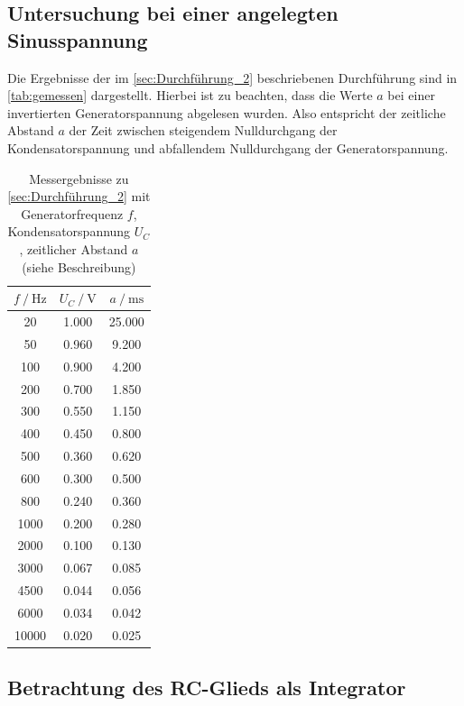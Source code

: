 \subsection{Untersuchung bei einer angelegten Sinusspannung}
\label{sec:Auswertung_Sinusspannung}

Die Ergebnisse der im \autoref{sec:Durchführung_2} beschriebenen Durchführung sind in \autoref{tab:gemessen} dargestellt. Hierbei ist zu beachten, dass die Werte $a$ bei einer invertierten Generatorspannung abgelesen wurden. Also entspricht der zeitliche Abstand $a$ der Zeit zwischen steigendem Nulldurchgang der Kondensatorspannung und abfallendem Nulldurchgang der Generatorspannung.

\begin{table}
    \centering
    \caption{Messergebnisse zu \autoref{sec:Durchführung_2} mit Generatorfrequenz $f$, Kondensatorspannung $U_C$, zeitlicher Abstand $a$ (siehe Beschreibung)}
    \label{tab:gemessen}
    \begin{tabular}{c c c}
        \toprule
        $f \:/\: \si{\hertz}$ & $U_C \:/\: \si{\volt}$ & $a \:/\: \si{\milli\second}$ \\
        \midrule
        20 & 1.000 & 25.000 \\
        50 & 0.960 & 9.200 \\
        100 & 0.900 & 4.200 \\
        200 & 0.700 & 1.850 \\
        300 & 0.550 & 1.150 \\
        400 & 0.450 & 0.800 \\
        500 & 0.360 & 0.620 \\
        600 & 0.300 & 0.500 \\
        800 & 0.240 & 0.360 \\
        1000 & 0.200 & 0.280 \\
        2000 & 0.100 & 0.130 \\
        3000 & 0.067 & 0.085 \\
        4500 & 0.044 & 0.056 \\
        6000 & 0.034 & 0.042 \\
        10000 & 0.020 & 0.025 \\
        \bottomrule
    \end{tabular}
\end{table}

\subsection{Betrachtung des RC-Glieds als Integrator}
\label{sec:Auswertung_Integrator}


